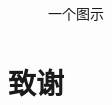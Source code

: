 \documentclass[12pt,a4paper,oneside,openany]{book}
\begin{document}
\begin{figure}[!h]
\begin{center}
\fbox{\rule{0pt}{2in} \rule{0.9\linewidth}{0pt}}
\end{center}
\caption{一个图示}
\end{figure}

\nocite{*} %

\backmatter



\chapter{致\hspace{1.5em}谢}


\end{document}
